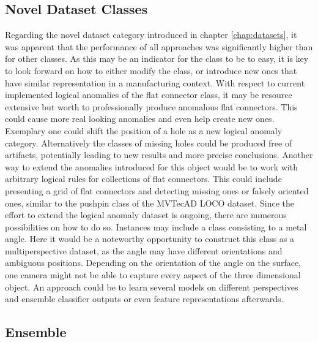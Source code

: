 \subsection{Novel Dataset Classes}
Regarding the novel dataset category introduced in chapter \ref{chap:datasets}, it was apparent that the performance of all approaches was significantly higher than for other classes. 
As this may be an indicator for the class to be to easy, it is key to look forward on how to either modify the class, or introduce new ones that have similar representation in a 
manufacturing context. \newline
With respect to current implemented logical anomalies of the flat connector class, it may be resource extensive but worth to professionally produce anomalous flat connectors. This 
could cause more real looking anomalies and even help create new ones. Exemplary one could shift the position of a hole as a new logical anomaly category. Alternatively the classes 
of missing holes could be produced free of artifacts, potentially leading to new results and more precise conclusions. Another way to extend the anomalies introduced for this 
object would be to work with arbitrary logical rules for collections of flat connectors. This could include presenting a grid of flat connectors and detecting missing ones or falsely 
oriented ones, similar to the pushpin class of the MVTecAD LOCO \cite{LOCODentsAndScratchesBergmann2022} dataset.\newline 
Since the effort to extend the logical anomaly dataset is ongoing, there are numerous possibilities on how to do so. Instances may include a class consisting to a metal angle. 
Here it would be a noteworthy opportunity to construct this class as a multiperspective dataset, as the angle may have different orientations and ambiguous positions. Depending 
on the orientation of the angle on the surface, one camera might not be able to capture every aspect of the three dimensional object. An approach could be to learn several models 
on different perspectives and ensemble classifier outputs or even feature representations afterwards.

\subsection{Ensemble}

